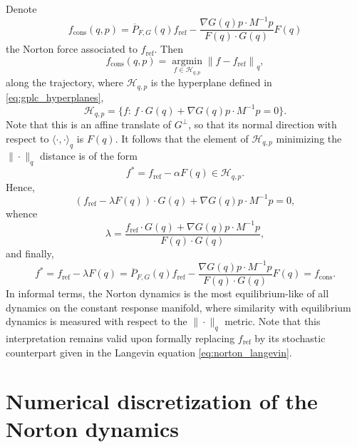 \documentclass[pdflatex,sn-mathphys]{sn-jnl}%
\theoremstyle{thmstyleone}%
\theoremstyle{thmstyletwo}%
\theoremstyle{thmstylethree}%
\newcommand{\1}{\mathbbm{1}}
\DeclareMathOperator*{\argmin}{argmin}
\begin{document}
Denote
\[f_{\mathrm{cons}}(q,p) = \overline{P}_{F,G}(q) f_{\mathrm{ref}} - \frac{\nabla G(q) p\cdot M^{-1}p}{F(q)\cdot G(q)}F(q)\]
the Norton force associated to $f_{\mathrm{ref}}$. Then 
\begin{equation}
    f_{\mathrm{cons}}(q,p)= \underset{f\in \mathcal{H}_{q,p}}{\argmin} \left\| f- f_{\mathrm{ref}}\right\|_q,
\end{equation}
along the trajectory, where $\mathcal{H}_{q,p}$ is the hyperplane defined in \eqref{eq:gplc_hyperplanes},
\[\mathcal{H}_{q,p}=\{f:\, f\cdot G(q) + \nabla G(q)p\cdot M^{-1}p = 0\}.\]
Note that this is an affine translate of $G^\perp$, so that its normal direction with respect to $\langle \cdot ,\cdot \rangle_q$ is $F(q)$.
It follows that the element of $\mathcal{H}_{q,p}$ minimizing the $\|\cdot\|_q$ distance is of the form 
\[f^* = f_{\mathrm{ref}} -\alpha F(q) \in \mathcal{H}_{q,p}.\]
Hence,
\[\left(f_{\mathrm{ref}} -\lambda F(q)\right)\cdot G(q) + \nabla G(q)p\cdot M^{-1}p =0,\]
whence 
\[\lambda = \frac{f_{\mathrm{ref}}\cdot G(q) +\nabla G(q)p\cdot M^{-1}p}{F(q)\cdot G(q)},\]
and finally,
\[f^*=f_{\mathrm{ref}}-\lambda F(q)=\overline P_{F,G}(q)f_{\mathrm{ref}}-\frac{\nabla G(q)p\cdot M^{-1}p}{F(q)\cdot G(q)}F(q)=f_{\mathrm{cons}}.\]
In informal terms, the Norton dynamics is the most equilibrium-like of all dynamics on the constant response manifold, where similarity with equilibrium dynamics is measured with respect to the $\|\cdot\|_q$ metric. Note that this interpretation remains valid upon formally replacing $f_{\mathrm{ref}}$ by its stochastic counterpart given in the Langevin equation \eqref{eq:norton_langevin}.

\section{Numerical discretization of the Norton dynamics}
\end{document}
